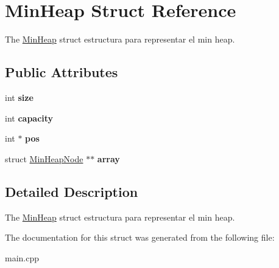 \hypertarget{struct_min_heap}{}\section{Min\+Heap Struct Reference}
\label{struct_min_heap}


The \hyperlink{struct_min_heap}{Min\+Heap} struct estructura para representar el min heap.  


\subsection*{Public Attributes}
\begin{DoxyCompactItemize}
\item 
\mbox{\label{struct_min_heap_a656a275b0ca8c80647d6251c09d31247}} 
int {\bfseries size}
\item 
\mbox{\label{struct_min_heap_a88b4aa3e66392a3eabbf2517a9a79a02}} 
int {\bfseries capacity}
\item 
\mbox{\label{struct_min_heap_acc599108d0291df02899573c8d171dac}} 
int $\ast$ {\bfseries pos}
\item 
\mbox{\label{struct_min_heap_a6b7b06e2fcee6b41d3ba7b9929dc8707}} 
struct \hyperlink{struct_min_heap_node}{Min\+Heap\+Node} $\ast$$\ast$ {\bfseries array}
\end{DoxyCompactItemize}


\subsection{Detailed Description}
The \hyperlink{struct_min_heap}{Min\+Heap} struct estructura para representar el min heap. 

The documentation for this struct was generated from the following file\+:\begin{DoxyCompactItemize}
\item 
main.\+cpp\end{DoxyCompactItemize}
